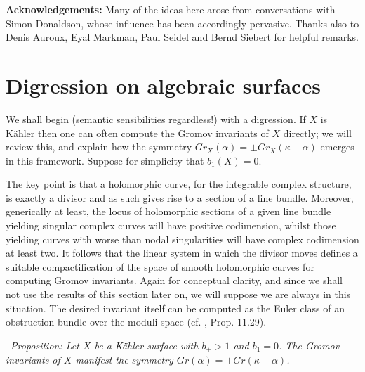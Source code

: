 \documentclass[10pt]{article}
\newcounter{Universal}[section]
\renewcommand{\theUniversal}{\thesection.\arabic{Universal}}
\newenvironment{Italic}{\refstepcounter{Universal} \par \vspace{0.5cm}
\noindent {\bf (\theUniversal)}\ \it}{\par \vspace{0.5cm}}
\newenvironment{Prop}{\begin{Italic}{\sc Proposition:} }{\end{Italic}}
\begin{document}
\vspace{0.4cm}

\noindent \textbf{Acknowledgements:}  Many of the ideas here arose
from conversations with Simon Donaldson, whose influence has been
accordingly pervasive.  Thanks also to Denis Auroux, Eyal Markman,
Paul Seidel and Bernd Siebert for helpful remarks.


\section{Digression on algebraic surfaces}

We shall begin (semantic sensibilities regardless!) with
a digression.  If $X$ is K\"ahler then one can
often compute the Gromov invariants of $X$ directly;  we will review
this, and explain how the symmetry $Gr_X (\alpha) = \pm Gr_X
(\kappa-\alpha)$ emerges in this framework.  Suppose for simplicity that $b_1
(X) = 0$.

\vspace{0.2cm}

\noindent  The key point is that a holomorphic
curve, for the integrable complex structure, is exactly a divisor and
as such gives rise to a section of a line bundle.  Moreover,
generically at least, the locus
of holomorphic sections of a given line bundle yielding singular complex curves
will have positive codimension, whilst those yielding curves with
worse than nodal singularities will have complex codimension at
least two.  It follows that the linear system in which the divisor
moves defines a suitable compactification of the space of smooth
holomorphic curves for computing Gromov invariants.  Again for
conceptual clarity, and since we shall not use the results of this
section later on, we will suppose we are always in this situation.  The
desired invariant itself can be computed as the Euler class of 
an obstruction bundle over the moduli space (cf. \cite{Salamon:SW},
Prop. 11.29).

\begin{Prop} \label{quotientalg}
Let $X$ be a K\"ahler surface with $b_+>1$ and $b_1=0$.  
The Gromov invariants of $X$ manifest the symmetry $Gr(\alpha) = \pm
Gr(\kappa-\alpha)$. 
\end{Prop}
\end{document}

